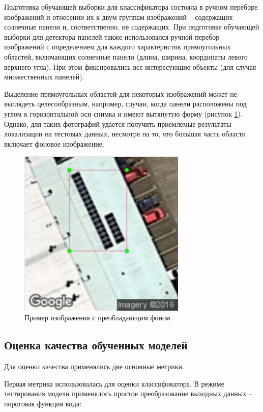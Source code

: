 Подготовка обучающей выборки для классификатора состояла в ручном переборе изображений и отнесении их к двум группам изображений -- содержащих солнечные панели и, соответственно, не содержащих. При подготовке обучающей выборки для детектора панелей также использовался ручной перебор изображений с определением для каждого характеристик прямоугольных областей, включающих солнечные панели (длина, ширина, координаты левого верхнего угла). При этом фиксировались все интересующие объекты (для случая множественных панелей). 

Выделение прямоугольных областей для некоторых изображений может не выглядеть целесообразным, например, случаи, когда панели расположены под углом к горизонтальной оси снимка и имеют вытянутую форму (рисунок \ref{fig:background_dominate}). Однако, для таких фотографий удается получить приемлемые результаты локализации на тестовых данных, несмотря на то, что большая часть области включает фоновое изображение.
 
\begin{figure}[ht]
	\centering
	\includegraphics[width=8cm]{man-source/images/ch4/pic4-18.png}
	\caption{Пример изображения с преобладающим фоном}
	\label{fig:background_dominate}
\end{figure}

\subsection{Оценка качества обученных моделей}

Для оценки качества применялись две основные метрики. 

Первая метрика использовалась для оценки классификатора. В режиме тестирования модели применялось простое преобразование выходных данных -- пороговая функция вида:

